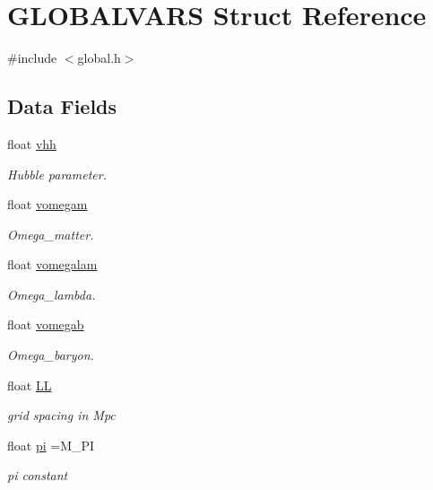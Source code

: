 \hypertarget{struct_g_l_o_b_a_l_v_a_r_s}{\section{G\+L\+O\+B\+A\+L\+V\+A\+R\+S Struct Reference}
\label{struct_g_l_o_b_a_l_v_a_r_s}
}


{\ttfamily \#include $<$global.\+h$>$}

\subsection*{Data Fields}
\begin{DoxyCompactItemize}
\item 
float \hyperlink{struct_g_l_o_b_a_l_v_a_r_s_a39815c36c9346dbadb579adf21993128}{vhh}
\begin{DoxyCompactList}\small\item\em Hubble parameter. \end{DoxyCompactList}\item 
float \hyperlink{struct_g_l_o_b_a_l_v_a_r_s_a305e8a7c8d8651e668ee02b94e6e82d2}{vomegam}
\begin{DoxyCompactList}\small\item\em Omega\+\_\+matter. \end{DoxyCompactList}\item 
float \hyperlink{struct_g_l_o_b_a_l_v_a_r_s_a2bec3e5efd354f961ca1ead243e72105}{vomegalam}
\begin{DoxyCompactList}\small\item\em Omega\+\_\+lambda. \end{DoxyCompactList}\item 
float \hyperlink{struct_g_l_o_b_a_l_v_a_r_s_a7c6766111ac26084f40a912b0ac625d3}{vomegab}
\begin{DoxyCompactList}\small\item\em Omega\+\_\+baryon. \end{DoxyCompactList}\item 
float \hyperlink{struct_g_l_o_b_a_l_v_a_r_s_a1f72032bbac96d14f6311c15bbcc9788}{L\+L}
\begin{DoxyCompactList}\small\item\em grid spacing in Mpc \end{DoxyCompactList}\item 
float \hyperlink{struct_g_l_o_b_a_l_v_a_r_s_a9cb0638a7b1d7af8ff421d2dc025d3a8}{pi} =M\+\_\+\+P\+I
\begin{DoxyCompactList}\small\item\em pi constant \end{DoxyCompactList}\item 

\end{DoxyCompactItemize}
